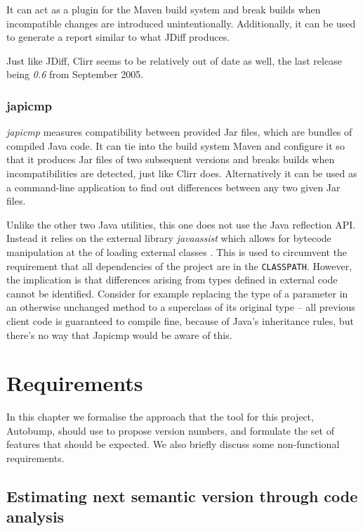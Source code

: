 \documentclass{l4proj}
\newcommand\genericstyle{\lstset{basicstyle=\ttm}}
\newcommand\codeinline[1]{{\genericstyle\lstinline!#1!}}
\begin{document}
It can act as a plugin for the Maven build system and break builds
when incompatible changes are introduced unintentionally.
Additionally, it can be used to generate a report similar to what
JDiff produces.

Just like JDiff, Clirr seems to be relatively out of date as well, the
last release being  \textit{0.6} from September 2005.

\subsection{japicmp}

\textit{japicmp} \cite{Japicmp} measures compatibility between
provided Jar files, which are bundles of compiled Java code. It can
tie into the build system Maven and configure it so that it produces
Jar files of two subsequent versions and breaks builds when
incompatibilities are detected, just like Clirr does. Alternatively it
can be used as a command-line application to find out differences
between any two given Jar files.

Unlike the other two Java utilities, this one does not use the Java
reflection API. Instead it relies on the external library
\textit{javaassist} \cite{JavaAssist} which allows for bytecode
manipulation at the of loading external classes \cite{BytecodeManip}.
This is used to circumvent the requirement that all dependencies of
the project are in the \codeinline{CLASSPATH}. However, the
implication is that differences arising from types defined in external
code cannot be identified. Consider for example replacing the type of
a parameter in an otherwise unchanged method to a superclass of its
original type -- all previous client code is guaranteed to compile
fine, because of Java's inheritance rules, but there's no way that
Japicmp would be aware of this.

\chapter{Requirements}
\label{Requirements}

In this chapter we formalise the approach that the tool for this
project, Autobump, should use to propose version numbers, and
formulate the set of features that should be expected. We also briefly
discuss some non-functional requirements.

\section{Estimating next semantic version through code analysis}
\end{document}
